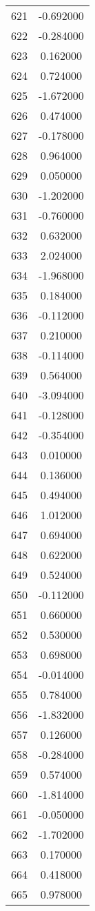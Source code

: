 \documentclass[12pt]{article}
\begin{document}
\begin{longtable}{@{}cc@{}}
621 & -0.692000 \\
622 & -0.284000 \\
623 & 0.162000 \\
624 & 0.724000 \\
625 & -1.672000 \\
626 & 0.474000 \\
627 & -0.178000 \\
628 & 0.964000 \\
629 & 0.050000 \\
630 & -1.202000 \\
631 & -0.760000 \\
632 & 0.632000 \\
633 & 2.024000 \\
634 & -1.968000 \\
635 & 0.184000 \\
636 & -0.112000 \\
637 & 0.210000 \\
638 & -0.114000 \\
639 & 0.564000 \\
640 & -3.094000 \\
641 & -0.128000 \\
642 & -0.354000 \\
643 & 0.010000 \\
644 & 0.136000 \\
645 & 0.494000 \\
646 & 1.012000 \\
647 & 0.694000 \\
648 & 0.622000 \\
649 & 0.524000 \\
650 & -0.112000 \\
651 & 0.660000 \\
652 & 0.530000 \\
653 & 0.698000 \\
654 & -0.014000 \\
655 & 0.784000 \\
656 & -1.832000 \\
657 & 0.126000 \\
658 & -0.284000 \\
659 & 0.574000 \\
660 & -1.814000 \\
661 & -0.050000 \\
662 & -1.702000 \\
663 & 0.170000 \\
664 & 0.418000 \\
665 & 0.978000 \\

\end{longtable}
\end{document}
